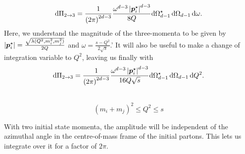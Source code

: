 \documentclass[../main.tex]{subfiles}
\begin{document}
            \begin{equation}
                \mathrm{d}\Pi_{2\to 3} = \frac{1}{\left(2\pi\right)^{2d-3}} \frac{\omega^{d-3} \left|\boldsymbol{p}_i^\star\right|^{d-3}}{8Q} \mathrm{d}\Omega_{d-1}^\star\, \mathrm{d}\Omega_{d-1}\, \mathrm{d}\omega.
            \end{equation}
            Here, we understand the magnitude of the three-momenta to be given by \(\left|\boldsymbol{p}_i^\star\right| = \frac{\sqrt{\lambda(Q^2, m_i^2, m_j^2)}}{2Q}\) and \(\omega = \frac{s-Q^2}{2\sqrt{s}}\).'
            It will also be useful to make a change of integration variable to \(Q^2\), leaving us finally with
            \begin{equation}
                \mathrm{d}\Pi_{2\to 3} = \frac{1}{\left(2\pi\right)^{2d-3}} \frac{\omega^{d-3} \left|\boldsymbol{p}_i^\star\right|^{d-3}}{16Q\sqrt{s}} \mathrm{d}\Omega_{d-1}^\star\, \mathrm{d}\Omega_{d-1}\, \mathrm{d}Q^2.
            \end{equation}

            \\
            \[(m_i + m_j)^2 \leq Q^2 \leq s\]

            With two initial state momenta, the amplitude will be independent of the azimuthal angle in the centre-of-mass frame of the initial partons.
            This lets us integrate over it for a factor of \(2\pi\).
\end{document}
